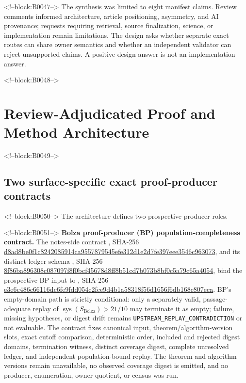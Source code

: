 \documentclass[11pt,a4paper]{article}
\begin{document}
<!--block:B0047-->
The synthesis was limited to eight manifest claims. Review comments informed architecture, article positioning, asymmetry, and AI provenance; requests requiring retrieval, source finalization, science, or implementation remain limitations. The design asks whether separate exact routes can share owner semantics and whether an independent validator can reject unsupported claims. A positive design answer is not an implementation answer.

<!--block:B0048-->
\hypertarget{review-adjudicated-proof-and-method-architecture}{%
\section{Review-Adjudicated Proof and Method Architecture}\label{review-adjudicated-proof-and-method-architecture}}

<!--block:B0049-->
\hypertarget{two-surface-specific-exact-proof-producer-contracts}{%
\subsection{Two surface-specific exact proof-producer contracts}\label{two-surface-specific-exact-proof-producer-contracts}}

<!--block:B0050-->
The architecture defines two prospective producer roles.

<!--block:B0051-->
\textbf{Bolza proof-producer (BP) population-completeness contract.} The notes-side contract , SHA-256 \url{d8ad8be0f1c8242085914ca9557879545efe312d1e2d7fe397eee3546c963073}, and its distinct ledger schema , SHA-256 \url{8f86ba896308c087097f8f0bcf45678d8ff8b51cd7b073b8bf0c5a79c65a4054}, bind the prospective BP input to , SHA-256 \url{e3e6c486c66116dc6fe9fdd054c2fce9d4b1a58318f56d1656f6db168c807eca}. BP's empty-domain path is strictly conditional: only a separately valid, passage-adequate replay of \(\operatorname{sys}(S_{\mathrm{Bolza}})>21/10\) may terminate it as empty; failure, missing hypotheses, or digest drift remains \texttt{UPSTREAM\_REPLAY\_CONTRADICTION} or not evaluable. The contract fixes canonical input, theorem/algorithm-version slots, exact cutoff comparison, deterministic order, included and rejected digest domains, termination witness, distinct coverage digest, complete unresolved ledger, and independent population-bound replay. The theorem and algorithm versions remain unavailable, no observed coverage digest is emitted, and no producer, enumeration, owner quotient, or census was run.
\end{document}
